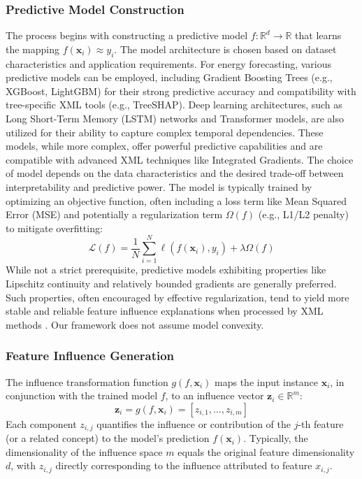\documentclass[final,authoryear,3p,times,review,sort&compress]{elsarticle}
\newcommand{\vect}[1]{\mathbf{#1}}
\newcommand{\set}[1]{\mathcal{#1}}
\begin{document}
\subsubsection{Predictive Model Construction}
\label{sec:predictive_model}
The process begins with constructing a predictive model $f: \mathbb{R}^d \to \mathbb{R}$ that learns the mapping $f(\vect{x}_i) \approx y_i$. The model architecture is chosen based on dataset characteristics and application requirements. For energy forecasting, various predictive models can be employed, including Gradient Boosting Trees (e.g., XGBoost, LightGBM) for their strong predictive accuracy and compatibility with tree-specific XML tools (e.g., TreeSHAP). Deep learning architectures, such as Long Short-Term Memory (LSTM) networks and Transformer models, are also utilized for their ability to capture complex temporal dependencies. These models, while more complex, offer powerful predictive capabilities and are compatible with advanced XML techniques like Integrated Gradients. The choice of model depends on the data characteristics and the desired trade-off between interpretability and predictive power. The model is typically trained by optimizing an objective function, often including a loss term like Mean Squared Error (MSE) and potentially a regularization term $\Omega(f)$ (e.g., L1/L2 penalty) to mitigate overfitting:
\begin{equation}
    \set{L}(f) = \frac{1}{N} \sum_{i=1}^N \ell(f(\vect{x}_i), y_i) + \lambda \Omega(f)
\end{equation}
While not a strict prerequisite, predictive models exhibiting properties like Lipschitz continuity and relatively bounded gradients are generally preferred. Such properties, often encouraged by effective regularization, tend to yield more stable and reliable feature influence explanations when processed by XML methods \citep{gouk2021regularisation}. Our framework does not assume model convexity.

\subsubsection{Feature Influence Generation}
\label{sec:influence_gen}
The influence transformation function $g(f, \vect{x}_i)$ maps the input instance $\vect{x}_i$, in conjunction with the trained model $f$, to an influence vector $\vect{z}_i \in \mathbb{R}^m$:
\begin{equation}
    \vect{z}_i = g(f, \vect{x}_i) = [z_{i,1}, \ldots, z_{i,m}]
\end{equation}
Each component $z_{i,j}$ quantifies the influence or contribution of the $j$-th feature (or a related concept) to the model's prediction $f(\vect{x}_i)$. Typically, the dimensionality of the influence space $m$ equals the original feature dimensionality $d$, with $z_{i,j}$ directly corresponding to the influence attributed to feature $x_{i,j}$.
\end{document}
